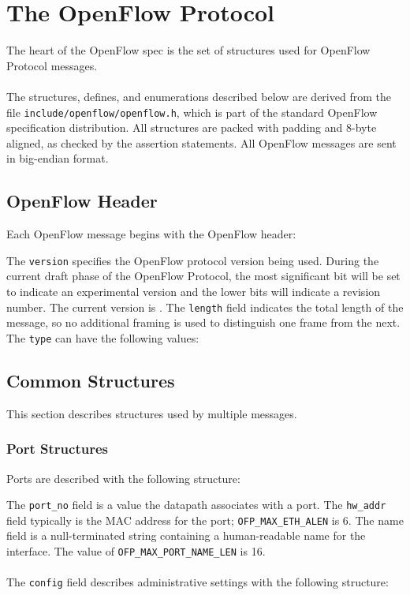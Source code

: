 \section{The OpenFlow Protocol}
The heart of the OpenFlow spec is the set of structures used for OpenFlow Protocol messages.  
\\\\
The structures, defines, and enumerations described below are derived from the file \verb|include/openflow/openflow.h|, which is part of the standard OpenFlow specification distribution.  All structures are packed with padding and 8-byte aligned, as checked by the assertion statements.  All OpenFlow messages are sent in big-endian format.  

\subsection{OpenFlow Header}
Each OpenFlow message begins with the OpenFlow header:


The \verb|version| specifies the OpenFlow protocol version being used.  During the current draft phase of the OpenFlow Protocol, the most significant bit will be set to indicate an experimental version and the lower bits will indicate a revision number.  The current version is .  The \verb|length| field indicates the total length of the message, so no additional framing is used to distinguish one frame from the next.  The \verb|type| can have the following values:



\subsection{Common Structures}
This section describes structures used by multiple messages.

\subsubsection{Port Structures}
Ports are described with the following structure:


The \verb|port_no| field is a value the datapath associates with a port. The \verb|hw_addr| field typically is the MAC address for the port; \verb|OFP_MAX_ETH_ALEN| is 6.  The name field is a null-terminated string containing a human-readable name for the interface.  The value of \verb|OFP_MAX_PORT_NAME_LEN| is 16.  
\\\\
The \verb|config| field describes administrative settings with the following structure:

